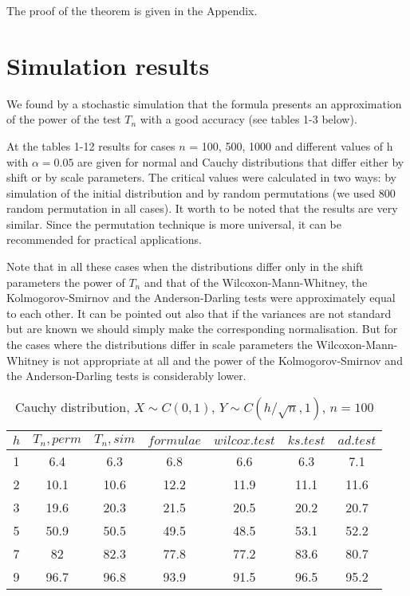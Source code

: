 \documentclass{svproc}
\begin{document}
The proof of the theorem is given in the Appendix.








\section{Simulation results}


 We found by a stochastic simulation that the formula presents an approximation of the power of the test $T_n$ with a good accuracy (see tables 1-3 below).

 At the tables 1-12 results for cases $n$ = 100, 500, 1000 and different values of h with $\alpha=0.05$ are given for normal and Cauchy distributions that differ either by shift or by scale parameters. The critical values were calculated in two ways: by simulation of the initial distribution and by random permutations (we used 800 random permutation in all cases). It worth to be noted that the results are very similar. Since the permutation technique is more universal, it can be recommended for practical applications.


Note that in all these cases when the distributions differ only in the shift parameters the power of  $T_n$ and  that of the Wilcoxon-Mann-Whitney, the
Kol\-mogorov-Smirnov and the Anderson-Darling tests were approximately equal to each other.
It can be pointed out also that if the variances are not standard  but are known we should simply make the corresponding normalisation.
But for the cases where the distributions differ in scale parameters the Wilcoxon-Mann-Whitney is not appropriate at all and the power of  the Kolmogorov-Smirnov and the Anderson-Darling tests is considerably lower.



\begin{table}
  \caption{Cauchy distribution, $X\sim C(0,1)$, $Y\sim C(h/\sqrt{n},1)$, $n=100$}
  \begin{center}
  \begin{tabular}{c@{\quad}c@{\quad}c@{\quad}c@{\quad}c@{\quad}c@{\quad}c}
  \hline
  $h$ & $T_n, perm$ & $T_n, sim$ & $formulae$ & $wilcox.test$ & $ks.test$ & $ad.test$ \\
  \hline
  1 & 6.4 & 6.3 & 6.8 & 6.6 & 6.3 & 7.1\\
  2 & 10.1 & 10.6 & 12.2 & 11.9 & 11.1 & 11.6 \\
  3 & 19.6 & 20.3 & 21.5 & 20.5 & 20.2 & 20.7 \\
  5 & 50.9 & 50.5 & 49.5 & 48.5 & 53.1 & 52.2 \\
  7 & 82 & 82.3 & 77.8 & 77.2 & 83.6 & 80.7 \\
  9 & 96.7 & 96.8 & 93.9 & 91.5 & 96.5 & 95.2 \\
  \hline
  \end{tabular}
  \end{center}
\end{table}
\end{document}
